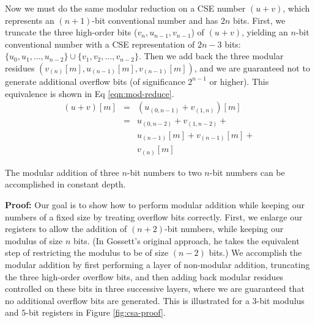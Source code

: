 \documentclass[twoside]{article}
\begin{document}
Now we must do the same modular reduction on a CSE number $(u+v)$,
which represents an $(n+1)$-bit conventional number and has
$2n$ bits.
%
%
First, we truncate the three high-order bits ($v_{n}, u_{n-1}, v_{n-1}$)
of $(u+v)$, yielding an $n$-bit
conventional number with a CSE representation of $2n-3$ bits:
$\{u_0, u_1, \ldots, u_{n-2}\} \cup \{v_1, v_2, \ldots, v_{n-2}\}$.
Then we add back the three modular residues
$(v_{(n)}[m], u_{(n-1)}[m], v_{(n-1)}[m])$, and we are guaranteed not to
generate additional overflow bits (of significance $2^{n-1}$ or higher). This equivalence
is shown in Eq \ref{eqn:mod-reduce}.
\begin{eqnarray}
(u+v)[m] &=& \left(u_{(0,n-1)} + v_{(1,n)}\right)[m] \nonumber \\
 &=& u_{(0,n-2)} +
     v_{(1,n-2)} + \nonumber \\
 & & u_{(n-1)}[m] +
     v_{(n-1)}[m] + \nonumber \\
 & & v_{(n)}[m]
\label{eqn:mod-reduce}
\end{eqnarray}

\begin{lemma}
The modular addition of three $n$-bit numbers to two $n$-bit numbers can be
accomplished
in constant depth.
\end{lemma}

\vspace*{12pt}
\noindent
{\bf Proof:}
Our goal is to show how to perform modular addition while keeping our numbers
of a fixed size by treating overflow bits correctly.
First, we enlarge our registers to allow the addition of $(n+2)$-bit numbers,
while keeping our modulus of size $n$ bits.
(In Gossett's original approach, he takes the equivalent step of restricting
the modulus to be of size $(n-2)$ bits.) We accomplish the modular addition
by first performing a layer of non-modular addition, truncating the three high-order
overflow bits, and then adding back modular residues controlled on these
bits in three successive layers, where we are guaranteed that no additional
overflow bits are generated.
This is illustrated for a $3$-bit modulus and $5$-bit registers
in Figure \ref{fig:csa-proof}.
\end{document}
